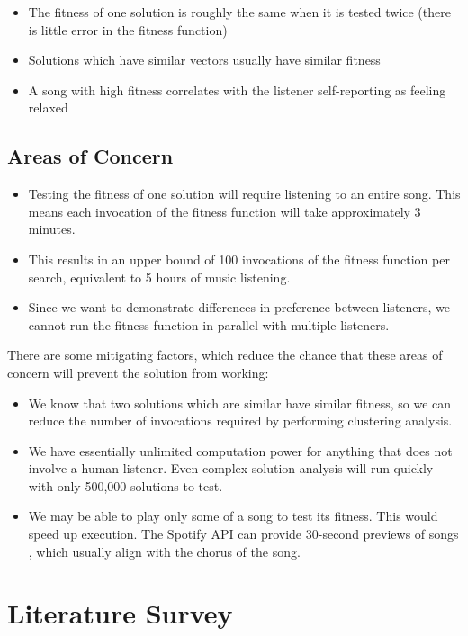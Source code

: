 \documentclass{article}
\begin{document}
	\begin{itemize}
		\item The fitness of one solution is roughly the same when it is tested twice (there is little error in the fitness function)
		\item Solutions which have similar vectors usually have similar fitness
		\item A song with high fitness correlates with the listener self-reporting as feeling relaxed
	\end{itemize}

	\subsection{Areas of Concern}
	\begin{itemize}
		\item Testing the fitness of one solution will require listening to an entire song. This means each invocation of the fitness function will take approximately 3 minutes.
		\item This results in an upper bound of 100 invocations of the fitness function per search, equivalent to 5 hours of music listening.
		\item Since we want to demonstrate differences in preference between listeners, we cannot run the fitness function in parallel with multiple listeners.
	\end{itemize}

	There are some mitigating factors, which reduce the chance that these areas of concern will prevent the solution from working:
	
	\begin{itemize}
		\item We know that two solutions which are similar have similar fitness, so we can reduce the number of invocations required by performing clustering analysis.
		\item We have essentially unlimited computation power for anything that does not involve a human listener. Even complex solution analysis will run quickly with only 500,000 solutions to test.
		\item We may be able to play only some of a song to test its fitness. This would speed up execution. The Spotify API can provide 30-second previews of songs \cite{spotify_get_nodate-1}, which usually align with the chorus of the song.
	\end{itemize}

	\section{Literature Survey}
	
\end{document}
